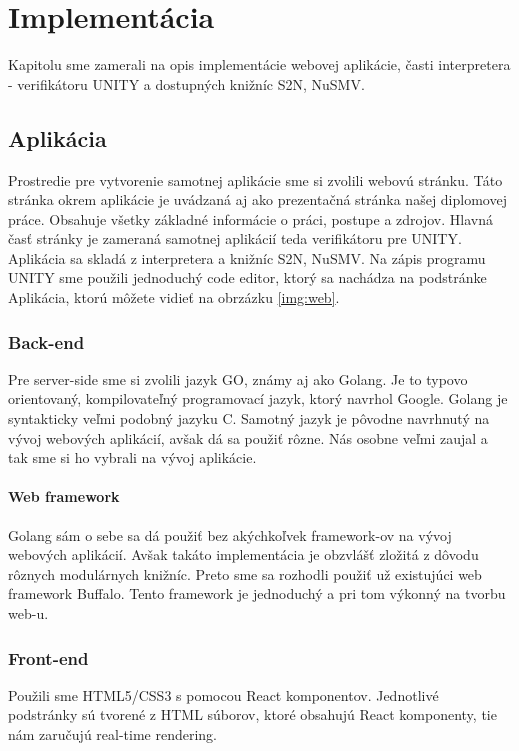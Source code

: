 \chapter{Implementácia}\label{chap:implementation}
Kapitolu sme zamerali na opis implementácie webovej aplikácie, časti interpretera - verifikátoru UNITY a dostupných knižníc S2N, 
NuSMV.

\section{Aplikácia}
Prostredie pre vytvorenie samotnej aplikácie sme si zvolili webovú stránku. Táto stránka okrem aplikácie je 
uvádzaná aj ako prezentačná stránka našej diplomovej práce. Obsahuje všetky základné informácie o práci, 
postupe a zdrojov. Hlavná časť stránky je zameraná samotnej aplikácií teda verifikátoru pre UNITY. Aplikácia 
sa skladá z interpretera a knižníc S2N, NuSMV. Na zápis programu UNITY sme použili jednoduchý code editor,
ktorý sa nachádza na podstránke Aplikácia, ktorú môžete vidieť na obrzázku \ref{img:web}.

\subsection{Back-end}
Pre server-side sme si zvolili jazyk GO, známy aj ako Golang. Je to typovo orientovaný, kompilovateľný 
programovací jazyk, ktorý navrhol Google. Golang je syntakticky veľmi podobný jazyku C. Samotný jazyk je 
pôvodne navrhnutý na vývoj webových aplikácií, avšak dá sa použiť rôzne. Nás osobne veľmi zaujal a tak sme si ho
vybrali na vývoj aplikácie.

\subsubsection{Web framework}
Golang sám o sebe sa dá použiť bez akýchkoľvek framework-ov na vývoj webových aplikácií. Avšak takáto 
implementácia je obzvlášť zložitá z dôvodu rôznych modulárnych knižníc. Preto sme sa rozhodli použiť už 
existujúci web framework Buffalo. Tento framework je jednoduchý a pri tom výkonný na tvorbu web-u. 

\subsection{Front-end}
Použili sme HTML5/CSS3 s pomocou React komponentov. Jednotlivé podstránky sú tvorené z HTML súborov, ktoré
obsahujú React komponenty, tie nám zaručujú real-time rendering. 

